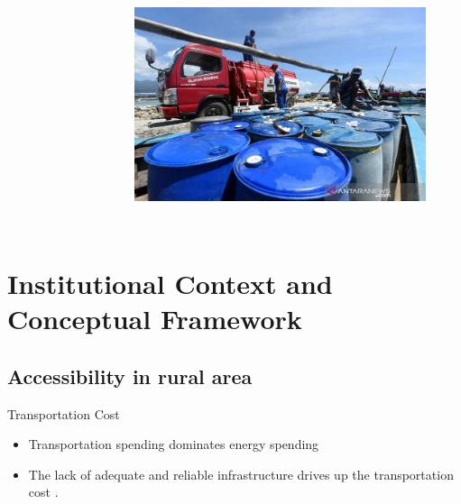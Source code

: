 \documentclass[
11pt,notheorems,compress,hyperref={pdfauthor=Maghfira Ramadhani}
]{beamer}
\begin{document}
\begin{frame}
\begin{columns}[T,onlytextwidth]
\begin{figure}[t]
        \label{f:graph1}
        \end{figure}
    \begin{figure}[t]
        \includegraphics[scale=0.2]{Final_Project/image/bbm-satu-harga_1.jpg}
        \label{f:graph1}
        \end{figure}
\end{columns}
\end{frame}

\section{Institutional Context and Conceptual Framework}
\subsection{Accessibility in rural area}
\begin{frame}
\begin{exampleblock}{Transportation Cost}
\begin{itemize}
    \item Transportation spending dominates energy spending \citep{sambodo_2019}
    \item The lack of adequate and reliable infrastructure drives up the transportation cost \citep{sandee_2016}.
\end{itemize}
\end{exampleblock}
\end{frame}
\end{document}
